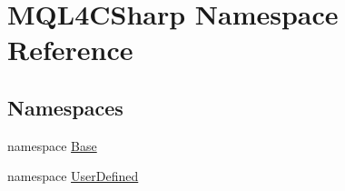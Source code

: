 \hypertarget{namespace_m_q_l4_c_sharp}{}\section{M\+Q\+L4\+C\+Sharp Namespace Reference}
\label{namespace_m_q_l4_c_sharp}
\subsection*{Namespaces}
\begin{DoxyCompactItemize}
\item 
namespace \hyperlink{namespace_m_q_l4_c_sharp_1_1_base}{Base}
\item 
namespace \hyperlink{namespace_m_q_l4_c_sharp_1_1_user_defined}{User\+Defined}
\end{DoxyCompactItemize}
